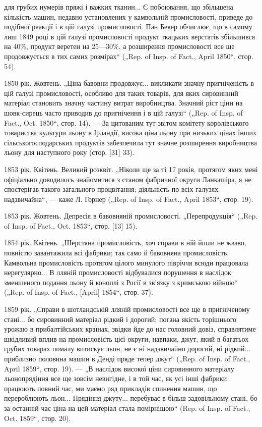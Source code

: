 для грубих нумерів пряжі і важких тканин... Є побоювання, що
збільшена кількість машин, недавно установлених у камвольній
промисловості, приведе до подібної реакції і в цій галузі промисловості.
Пан Бекер обчислює, що в самому лиш 1849 році в цій
галузі промисловості продукт ткацьких верстатів збільшився на
40\%, продукт веретен на 25—30\%, а розширення промисловості
все ще продовжується в тих самих розмірах“ („Rep. of Insp.
of Fact., April 1850“, стор. 54).

1850 рік. Жовтень. „Ціна бавовни продовжує... викликати
значну пригніченість в цій галузі промисловості, особливо для
таких товарів, для яких сировинний матеріал становить значну
частину витрат виробництва. Значний ріст ціни на шовк-сирець
часто приводив до пригнічення і в цій галузі“ („Rep. of Insp. of
Fact., Oct. 1850“, стор. 14). — За цитованим тут звітом комітету
королівського товариства культури льону в Ірландії, висока
ціна льону при низьких цінах інших сільськогосподарських продуктів
забезпечила тут значне розширення виробництва льону
для наступного року (стор. [31] 33).

1853 рік. Квітень. Великий розквіт. „Ніколи ще за ті 17 років,
протягом яких мені офіціально доводилось знайомитися з станом
фабричної округи Ланкашіра, я не спостерігав такого загального
процвітання; діяльність по всіх галузях надзвичайна“, —
каже Л. Горнер („Rep. of Insp. of Fact., April 1853“, стор. 19).

1853 рік. Жовтень. Депресія в бавовняній промисловості.
„Перепродукція“ („Rep. of Insp. of Fact., Oct. 1853“, стор. [13] 15).

1854 рік. Квітень. „Шерстяна промисловість, хоч справи в ній
йшли не жваво, повністю завантажила всі фабрики; так само
й бавовняна промисловість. Камвольна промисловість протягом
цілого минулого півріччя всюди працювала нерегулярно... В лляній
промисловості відбувалися порушення в наслідок зменшеного
подання льону й коноплі з Росії в зв’язку з кримською війною“
(„Rep. of Insp. of Fact., [April] 1854“, стор. 37).

1859 рік. „Справи в шотландській лляній промисловості все
ще в пригніченому стані... бо сировинний матеріал рідкий і дорогий;
погана якість торішнього урожаю в прибалтійських країнах,
звідки йде до нас головний довіз, справлятиме шкідливий вплив
на промисловість цієї округи; навпаки, джут, який в багатьох
грубих товарах помалу витискує льон, не є ні надзвичайно дорогий,
ні рідкий... приблизно половина машин в Денді пряде
тепер джут“ („Rep. of Insp. of Fact., April 1859“, стор. 19). —
„В наслідок високої ціни сировинного матеріалу льонопрядіння
все ще зовсім невигідне, і в той час, як усі інші фабрики працюють
повний час, ми маємо ряд прикладів спинення машин,
що перероблюють льон... Прядіння джуту... перебуває в більш
задовільному стані, бо за останній час ціна на цей матеріал
стала помірнішою“ (Rep. of Insp. of Fact., Oct. 1859“, стор. 20).

